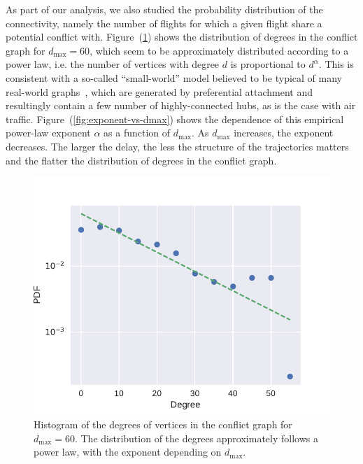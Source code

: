 As part of our analysis, we also studied the probability
distribution of the connectivity, namely the number of flights
for which a given flight share a potential conflict with. 
Figure~(\ref{fig:hist-degree}) shows
the distribution of degrees in the conflict graph for $d_{\max}=60$,
which seem to be approximately distributed according to a power law, i.e. 
the number of vertices with degree $d$ is proportional to $d^{\alpha}$.
This is consistent with a so-called ``small-world'' model believed to be typical of many real-world graphs~\cite{barabasi:99}, which are generated by preferential attachment and resultingly contain a few number of highly-connected hubs, as is the case with air traffic.
Figure~(\ref{fig:exponent-vs-dmax}) shows the dependence of this empirical power-law exponent $\alpha$ as a function of $d_{\max}$.
As $d_{\max}$ increases, the exponent decreases.
The larger the delay, the less the structure of the trajectories matters and the flatter the distribution of degrees in the conflict graph.

\begin{figure}[htpb]
\includegraphics[width=0.95\columnwidth]{pics/instances/connectivity_pdf.pdf}
\caption[Histogram of degrees]{Histogram of the degrees of vertices in the conflict graph for $d_{\max} = 60$. 
The distribution of the degrees approximately follows a power law, with the exponent depending on $d_{\max}$.
}
\label{fig:hist-degree}
\end{figure}

